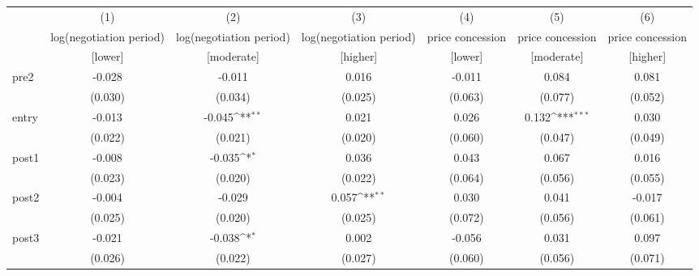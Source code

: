 {
\def\sym#1{\ifmmode^{#1}\else\(^{#1}\)\fi}
\begin{adjustbox}{max width=\textwidth}
\begin{tabular}{l*{6}{c}}
\toprule
            &\multicolumn{1}{c}{(1)}&\multicolumn{1}{c}{(2)}&\multicolumn{1}{c}{(3)}&\multicolumn{1}{c}{(4)}&\multicolumn{1}{c}{(5)}&\multicolumn{1}{c}{(6)}\\
            &\multicolumn{1}{c}{log(negotiation period)}&\multicolumn{1}{c}{log(negotiation period)}&\multicolumn{1}{c}{log(negotiation period)}&\multicolumn{1}{c}{price concession}&\multicolumn{1}{c}{price concession}&\multicolumn{1}{c}{price concession}\\
&[lower]&[moderate]&[higher]&[lower]&[moderate]&[higher]\\
\midrule
pre2        &      -0.028         &      -0.011         &       0.016         &      -0.011         &       0.084         &       0.081         \\
            &     (0.030)         &     (0.034)         &     (0.025)         &     (0.063)         &     (0.077)         &     (0.052)         \\
\addlinespace
entry       &      -0.013         &      -0.045\sym{**} &       0.021         &       0.026         &       0.132\sym{***}&       0.030         \\
            &     (0.022)         &     (0.021)         &     (0.020)         &     (0.060)         &     (0.047)         &     (0.049)         \\
\addlinespace
post1       &      -0.008         &      -0.035\sym{*}  &       0.036         &       0.043         &       0.067         &       0.016         \\
            &     (0.023)         &     (0.020)         &     (0.022)         &     (0.064)         &     (0.056)         &     (0.055)         \\
\addlinespace
post2       &      -0.004         &      -0.029         &       0.057\sym{**} &       0.030         &       0.041         &      -0.017         \\
            &     (0.025)         &     (0.020)         &     (0.025)         &     (0.072)         &     (0.056)         &     (0.061)         \\
\addlinespace
post3       &      -0.021         &      -0.038\sym{*}  &       0.002         &      -0.056         &       0.031         &       0.097         \\
            &     (0.026)         &     (0.022)         &     (0.027)         &     (0.060)         &     (0.056)         &     (0.071)         \\

\end{tabular}
\end{adjustbox}}
